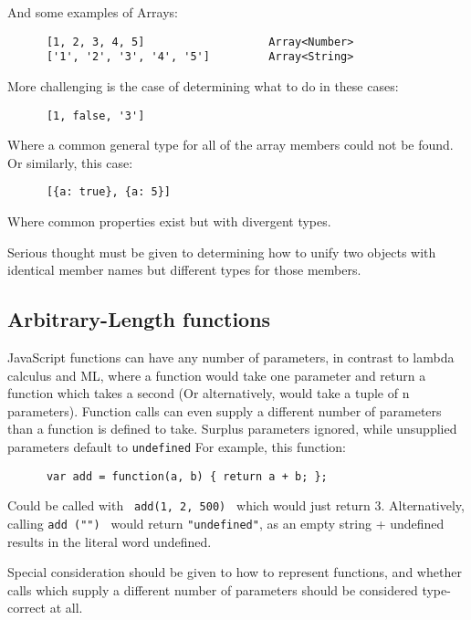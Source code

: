 \documentclass[british, twoside]{bhamthesis}
\theoremstyle{definition}
\begin{document}
    And some examples of Arrays:

    \begin{lstlisting}
      [1, 2, 3, 4, 5]                   Array<Number>
      ['1', '2', '3', '4', '5']         Array<String>
    \end{lstlisting}

    More challenging is the case of determining what to do in these cases:

    \begin{lstlisting}
      [1, false, '3']
    \end{lstlisting}

    Where a common general type for all of the array members could not be found. Or similarly, this case:

    \begin{lstlisting}
      [{a: true}, {a: 5}]
    \end{lstlisting}

    Where common properties exist but with divergent types.

    Serious thought must be given to determining how to unify two objects with identical member names but different types for those members.

  \subsection{Arbitrary-Length functions}
    JavaScript functions can have any number of parameters, in contrast to lambda calculus and ML, where a function would take one parameter and return a function which takes a second (Or alternatively, would take a tuple of n parameters). Function calls can even supply a different number of parameters than a function is defined to take. Surplus parameters ignored, while unsupplied parameters default to \texttt {undefined} For example, this function:

    \begin{lstlisting}
      var add = function(a, b) { return a + b; };
    \end{lstlisting}

    Could be called with \texttt { add(1, 2, 500) } which would just return 3. Alternatively, calling \texttt {add ("") } would return \texttt {"undefined"}, as an empty string + undefined results in the literal word undefined.

    Special consideration should be given to how to represent functions, and whether calls which supply a different number of parameters should be considered type-correct at all.
\end{document}
